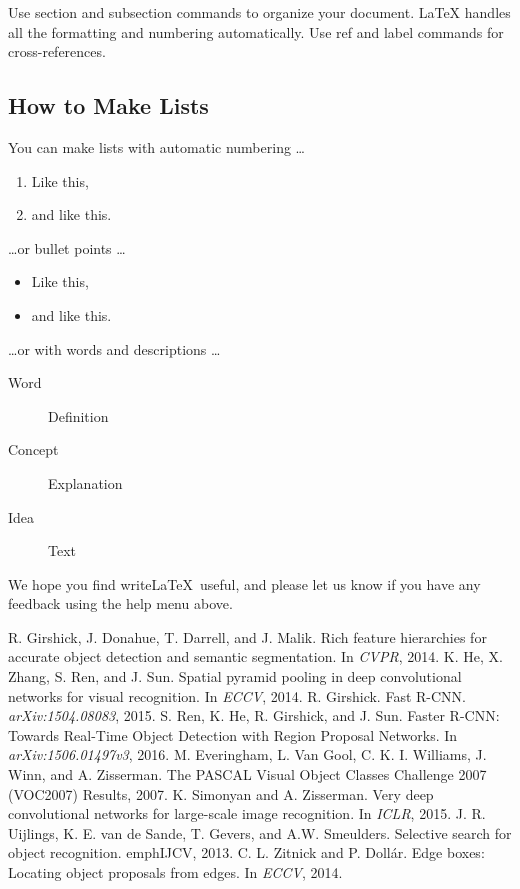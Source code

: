 \documentclass[a4paper]{article}
\begin{document}
Use section and subsection commands to organize your document. \LaTeX{} handles all the formatting and numbering automatically. Use ref and label commands for cross-references.

\subsection{How to Make Lists}

You can make lists with automatic numbering \dots

\begin{enumerate}
\item Like this,
\item and like this.
\end{enumerate}
\dots or bullet points \dots
\begin{itemize}
\item Like this,
\item and like this.
\end{itemize}
\dots or with words and descriptions \dots
\begin{description}
\item[Word] Definition
\item[Concept] Explanation
\item[Idea] Text
\end{description}

We hope you find write\LaTeX\ useful, and please let us know if you have any feedback using the help menu above.

\begin{thebibliography}{9}
R. Girshick, J. Donahue, T. Darrell, and J. Malik. Rich feature hierarchies for accurate object detection and semantic segmentation. In \emph{CVPR}, 2014.
K. He, X. Zhang, S. Ren, and J. Sun. Spatial pyramid pooling in deep convolutional networks for visual recognition. In \emph{ECCV}, 2014.
R. Girshick. Fast R-CNN. \emph{arXiv:1504.08083}, 2015.
S. Ren, K. He, R. Girshick, and J. Sun. Faster R-CNN: Towards Real-Time Object Detection with Region Proposal Networks. In \emph{arXiv:1506.01497v3}, 2016.
M. Everingham, L. Van Gool, C. K. I. Williams, J. Winn, and A. Zisserman. The PASCAL Visual Object Classes Challenge 2007 (VOC2007) Results, 2007.
K. Simonyan and A. Zisserman. Very deep convolutional networks for large-scale image recognition. In \emph{ICLR}, 2015.
J. R. Uijlings, K. E. van de Sande, T. Gevers, and A.W. Smeulders. Selective search for object recognition. emph{IJCV}, 2013.
C. L. Zitnick and P. Doll\'ar. Edge boxes: Locating object proposals from edges. In \emph{ECCV}, 2014.

\end{thebibliography}
\end{document}
